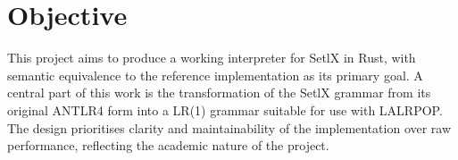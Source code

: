 \section{Objective}

This project aims to produce a working interpreter for SetlX in Rust\cite{rust}, with semantic equivalence to the reference implementation as its primary goal. A central part of this work is the transformation of the SetlX grammar from its original ANTLR4 form into a LR(1) grammar suitable for use with LALRPOP. The design prioritises clarity and maintainability of the implementation over raw performance, reflecting the academic nature of the project.
